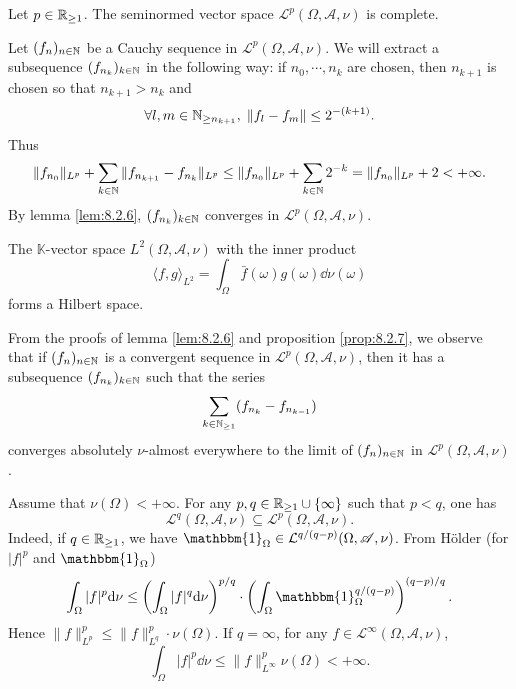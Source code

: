 \begin{propositionenv}\label{prop:8.2.7}
    Let $p \in \mathbb{R}_{\ge 1}$.
    The seminormed vector space $\mathcal{L}^p(\Omega,\mathscr{A},\nu)$ is complete.
\end{propositionenv}
\begin{proofenv}
    Let $(f_n)_{n \in \mathbb{N}}$ be a Cauchy sequence in $\mathcal{L}^p(\Omega, \mathscr{A}, \nu)$.
    We will extract a subsequence $(f_{n_{k}})_{k \in \mathbb{N}}$ in the following way:
    if $n_0,\cdots,n_k$ are chosen, then $n_{k+1}$ is chosen so that $n_{k+1} > n_k$ and
    $$\forall l,m \in \mathbb{N}_{\ge n_{k+1}}, \; \|f_l - f_m\| \le 2^{-(k+1)}.$$
    Thus
    $$\|f_{n_0}\|_{L^p} + \sum_{k \in \mathbb{N}} \|f_{n_{k+1}} - f_{n_k}\|_{L^p} \le \|f_{n_0}\|_{L^p} + \sum_{k \in \mathbb{N}}2^{-k} = \|f_{n_0}\|_{L^p} + 2 < + \infty.$$
    By lemma \ref{lem:8.2.6}, $(f_{n_{k}})_{k \in \mathbb{N}}$ converges in $\mathcal{L}^p(\Omega,\mathscr{A},\nu)$.
\end{proofenv}

\begin{corollaryenv}
    The $\mathbb{K}$-vector space $L^2(\Omega,\mathscr{A},\nu)$ with the inner product
    $$\langle f,g \rangle_{L^2} = \int_{\Omega} \bar{f}(\omega) g(\omega) \dd \nu(\omega)$$
    forms a Hilbert space.
\end{corollaryenv}
\begin{remark}
    From the proofs of lemma \ref{lem:8.2.6} and proposition \ref{prop:8.2.7},
    we observe that if $(f_n)_{n \in \mathbb{N}}$ is a convergent sequence in $\mathcal{L}^p(\Omega,\mathscr{A},\nu)$,
    then it has a subsequence $(f_{n_k})_{k \in \mathbb{N}}$ such that the series
    $$\sum_{k \in \mathbb{N}_{\ge 1}}(f_{n_{k}} - f_{n_{k-1}})$$
    converges absolutely $\nu$-almost everywhere to the limit of $(f_n)_{n \in \mathbb{N}}$ in $\mathcal{L}^p(\Omega,\mathscr{A},\nu)$.
\end{remark}

\begin{remark}
    Assume that $\nu(\Omega) < +\infty$.
    For any $p,q \in \mathbb{R}_{\ge 1} \cup \{\infty\}$ such that $p < q$, one has
    $$\mathcal{L}^q(\Omega,\mathscr{A},\nu) \subseteq \mathcal{L}^p(\Omega,\mathscr{A},\nu).$$
    Indeed, if $q \in \mathbb{R}_{\ge 1}$, we have $\mathbbm{1}_{\Omega} \in \mathcal{L}^{q/(q - p)}(\Omega,\mathscr{A},\nu)$.
    From Hölder (for $|f|^p$ and $\mathbbm{1}_{\Omega}$)
    $$\int_{\Omega} |f|^p \dd \nu \le \left(\int_{\Omega} |f|^q \dd \nu\right)^{p/q} \cdot \left(\int_{\Omega} \mathbbm{1}_{\Omega}^{q/(q-p)}\right)^{(q-p)/q}.$$
    Hence $\|f\|^{p}_{L^p} \le \|f\|^p_{L^q} \cdot \nu(\Omega)$.
    If $q = \infty$, for any $f \in \mathcal{L}^\infty(\Omega,\mathscr{A},\nu)$,
    $$\int_{\Omega} |f|^p \dd \nu \le \|f\|^p_{L^\infty} \nu(\Omega) < + \infty.$$
\end{remark}


